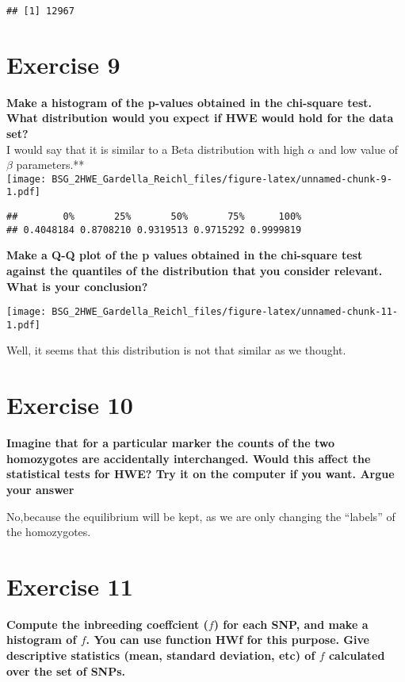 \documentclass[]{article}
\begin{document}
\begin{verbatim}
## [1] 12967
\end{verbatim}

\section{Exercise 9}\label{exercise-9}

\textbf{Make a histogram of the p-values obtained in the chi-square
test. What distribution would you expect if HWE would hold for the data
set?}\\
I would say that it is similar to a Beta distribution with high
\(\alpha\) and low value of \(\beta\) parameters.**\\
\texttt{[image: BSG\_2HWE\_Gardella\_Reichl\_files/figure-latex/unnamed-chunk-9-1.pdf]}

\begin{verbatim}
##        0%       25%       50%       75%      100% 
## 0.4048184 0.8708210 0.9319513 0.9715292 0.9999819
\end{verbatim}

\textbf{Make a Q-Q plot of the p values obtained in the chi-square test
against the quantiles of the distribution that you consider relevant.
What is your conclusion?}

\texttt{[image: BSG\_2HWE\_Gardella\_Reichl\_files/figure-latex/unnamed-chunk-11-1.pdf]}

Well, it seems that this distribution is not that similar as we thought.

\section{Exercise 10}\label{exercise-10}

\textbf{Imagine that for a particular marker the counts of the two
homozygotes are accidentally interchanged. Would this affect the
statistical tests for HWE? Try it on the computer if you want. Argue
your answer}

No,because the equilibrium will be kept, as we are only changing the
``labels'' of the homozygotes.

\section{Exercise 11}\label{exercise-11}

\textbf{Compute the inbreeding coeffcient (\(f\)) for each SNP, and make
a histogram of \(f\). You can use function HWf for this purpose. Give
descriptive statistics (mean, standard deviation, etc) of \(f\)
calculated over the set of SNPs.}
\end{document}
